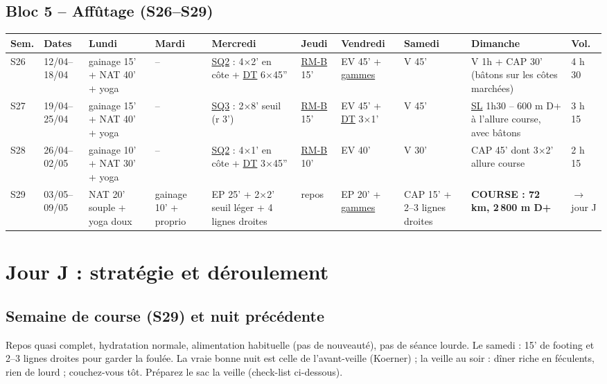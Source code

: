 \documentclass[10pt,a4paper]{article}
\newcommand{\rmb}{\hyperlink{rm-b}{RM-B}}
\newcommand{\sqb}{\hyperlink{sq2}{SQ2}}
\newcommand{\sqc}{\hyperlink{sq3}{SQ3}}
\newcommand{\dtl}{\hyperlink{dt}{DT}}
\newcommand{\gam}{\hyperlink{gammes}{gammes}}
\newcommand{\sln}{\hyperlink{legende}{SL}}
\begin{document}
\begin{landscape}
\subsection*{\color{acc} Bloc 5 -- Aff\^utage (S26--S29)}
\begin{tabular}{p{0.95cm}p{1.5cm}p{2.95cm}p{1.3cm}p{3.7cm}p{1.5cm}p{3.5cm}p{2.2cm}p{3.9cm}p{1.15cm}}
\toprule
\textbf{Sem.} & \textbf{Dates} & \textbf{Lundi} & \textbf{Mardi} & \textbf{Mercredi} & \textbf{Jeudi} & \textbf{Vendredi} & \textbf{Samedi} & \textbf{Dimanche} & \textbf{Vol.}\\
\midrule
S26 & 12/04--18/04 & gainage 15' + NAT 40' + yoga & -- & \sqb{} : 4$\times$2' en c\^ote + \dtl{} 6$\times$45'' & \rmb{} 15' & EV 45' + \gam{} & V 45' & V 1h + CAP 30' (b\^atons sur les c\^otes march\'ees) & 4 h 30\\
S27 & 19/04--25/04 & gainage 15' + NAT 40' + yoga & -- & \sqc{} : 2$\times$8' seuil (r 3') & \rmb{} 15' & EV 45' + \dtl{} 3$\times$1' & V 45' & \sln{} 1h30 -- 600 m D+ \`a l'allure course, avec b\^atons & 3 h 15\\
S28 & 26/04--02/05 & gainage 10' + NAT 30' + yoga & -- & \sqb{} : 4$\times$1' en c\^ote + \dtl{} 3$\times$45'' & \rmb{} 10' & EV 40' & V 30' & CAP 45' dont 3$\times$2' allure course & 2 h 15\\
S29 & 03/05--09/05 & NAT 20' souple + yoga doux & gainage 10' + proprio & EP 25' + 2$\times$2' seuil l\'eger + 4 lignes droites & repos & EP 20' + \gam{} & CAP 15' + 2--3 lignes droites & \textbf{COURSE : 72 km, 2\,800 m D+} & $\to$ jour J\\
\bottomrule
\end{tabular}
\end{landscape}
\normalsize

\clearpage
\section{Jour J : strat\'egie et d\'eroulement}

\subsection{Semaine de course (S29) et nuit pr\'ec\'edente}
Repos quasi complet, hydratation normale, alimentation habituelle (pas de
nouveaut\'e), pas de s\'eance lourde. Le samedi : 15' de footing et 2--3 lignes
droites pour garder la foul\'ee. La vraie bonne nuit est celle de l'avant-veille
(Koerner) ; la veille au soir : d\^iner riche en
f\'eculents, rien de lourd ; couchez-vous t\^ot. Pr\'eparez le sac la veille
(check-list ci-dessous).
\end{document}
